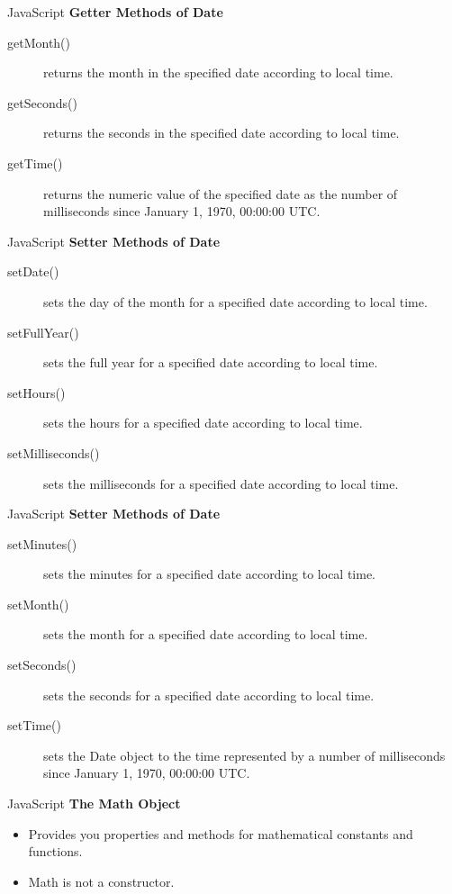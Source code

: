 \documentclass[14pt]{beamer}
\begin{document}
\begin{frame}{JavaScript}
\textbf{Getter Methods of Date}
\begin{description}
 \item [getMonth()] returns the month in the specified date according to local time.
 \item [getSeconds()] returns the seconds in the specified date according to local time.
 \item [getTime()] returns the numeric value of the specified date as the number of milliseconds since January 1, 1970, 00:00:00 UTC.
\end{description}
\end{frame}

\begin{frame}{JavaScript}
\textbf{Setter Methods of Date}
\begin{description}
 \item [setDate()] sets the day of the month for a specified date according to local time.
 \item [setFullYear()] sets the full year for a specified date according to local time.
 \item [setHours()] sets the hours for a specified date according to local time.
 \item [setMilliseconds()] sets the milliseconds for a specified date according to local time.
 \end{description}
\end{frame}

\begin{frame}{JavaScript}
\textbf{Setter Methods of Date}
\begin{description}
 \item [setMinutes()] sets the minutes for a specified date according to local time.
 \item [setMonth()] sets the month for a specified date according to local time.
 \item [setSeconds()] sets the seconds for a specified date according to local time.
 \item [setTime()] sets the Date object to the time represented by a number of milliseconds since January 1, 1970, 00:00:00 UTC.
\end{description}
\end{frame}

\begin{frame}{JavaScript}
\textbf{The Math Object}
\begin{itemize}
 \item Provides you properties and methods for mathematical constants and functions.
 \item Math is not a constructor.
\end{itemize}
\end{frame}
\end{document}

